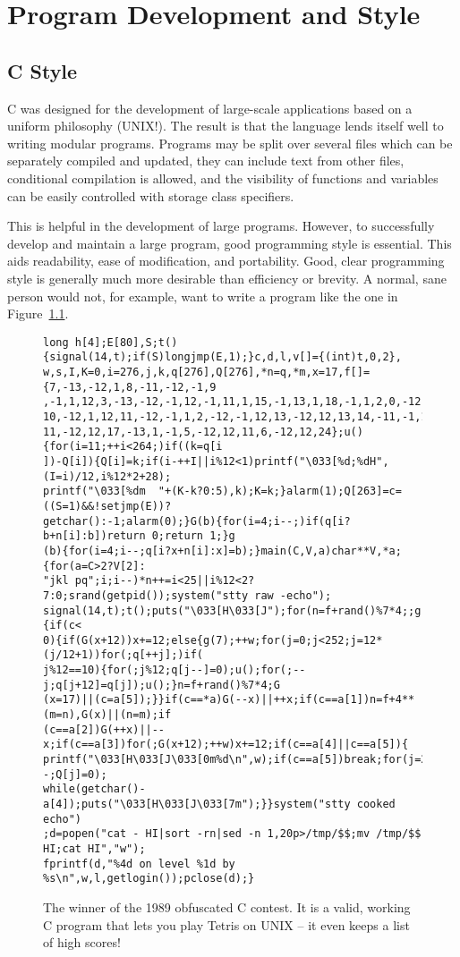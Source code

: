 \cleardoublepage
\chapter{Program Development and Style}
\section{C Style}
    C  was  designed for  the development of large-scale applications
based on a uniform philosophy (UNIX!).  The result is that the
language lends itself well to writing modular programs.   Programs
may be split over several files which can be separately compiled and
updated, they can include text from other files, conditional
compilation is allowed, and the visibility of  functions and 
variables can  be easily controlled with storage class specifiers.

     This is helpful in the development of large programs.
However, to successfully develop  and maintain  a large program, good
programming style is essential. This aids readability, ease of
modification, and portability. Good, clear programming  style is 
generally much  more desirable than efficiency or brevity.
A normal, sane person would not, for example, want to write a program 
like the one in Figure~\ref{obfuscate}.
\begin{figure}\small
\begin{verbatim}
long h[4];E[80],S;t(){signal(14,t);if(S)longjmp(E,1);}c,d,l,v[]={(int)t,0,2},
w,s,I,K=0,i=276,j,k,q[276],Q[276],*n=q,*m,x=17,f[]={7,-13,-12,1,8,-11,-12,-1,9
,-1,1,12,3,-13,-12,-1,12,-1,11,1,15,-1,13,1,18,-1,1,2,0,-12,-1,11,1,-12,1,13,
10,-12,1,12,11,-12,-1,1,2,-12,-1,12,13,-12,12,13,14,-11,-1,1,4,-13,-12,12,16,-
11,-12,12,17,-13,1,-1,5,-12,12,11,6,-12,12,24};u(){for(i=11;++i<264;)if((k=q[i
])-Q[i]){Q[i]=k;if(i-++I||i%12<1)printf("\033[%d;%dH",(I=i)/12,i%12*2+28);
printf("\033[%dm  "+(K-k?0:5),k);K=k;}alarm(1);Q[263]=c=((S=1)&&!setjmp(E))?
getchar():-1;alarm(0);}G(b){for(i=4;i--;)if(q[i?b+n[i]:b])return 0;return 1;}g
(b){for(i=4;i--;q[i?x+n[i]:x]=b);}main(C,V,a)char**V,*a;{for(a=C>2?V[2]:
"jkl pq";i;i--)*n++=i<25||i%12<2?7:0;srand(getpid());system("stty raw -echo");
signal(14,t);t();puts("\033[H\033[J");for(n=f+rand()%7*4;;g(7),u(),g(0)){if(c<
0){if(G(x+12))x+=12;else{g(7);++w;for(j=0;j<252;j=12*(j/12+1))for(;q[++j];)if(
j%12==10){for(;j%12;q[j--]=0);u();for(;--j;q[j+12]=q[j]);u();}n=f+rand()%7*4;G
(x=17)||(c=a[5]);}}if(c==*a)G(--x)||++x;if(c==a[1])n=f+4**(m=n),G(x)||(n=m);if
(c==a[2])G(++x)||--x;if(c==a[3])for(;G(x+12);++w)x+=12;if(c==a[4]||c==a[5]){
printf("\033[H\033[J\033[0m%d\n",w);if(c==a[5])break;for(j=264;j--;Q[j]=0);
while(getchar()-a[4]);puts("\033[H\033[J\033[7m");}}system("stty cooked echo")
;d=popen("cat - HI|sort -rn|sed -n 1,20p>/tmp/$$;mv /tmp/$$ HI;cat HI","w");
fprintf(d,"%4d on level %1d by %s\n",w,l,getlogin());pclose(d);}
\end{verbatim}
\caption{\label{obfuscate} The winner of the 1989 obfuscated C contest.  It
is a valid, working C program that lets you play Tetris on UNIX -- it even
keeps a list of high scores!}
\end{figure}

